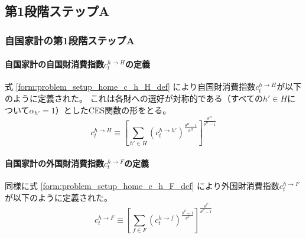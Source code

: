 
\subsection{第1段階ステップA}
\label{sec:chapter3_households_stage1a}

\subsubsection{自国家計の第1段階ステップA}
\label{sec:chapter3_households_stage1a_home}

\paragraph{自国家計の自国財消費指数\(c_t^{h\to H}\)の定義}
\label{sec:chapter3_households_stage1a_home_c_h_H_definition}
式
\eqref{form:problem_setup_home_c_h_H_def}
により自国財消費指数\(c_t^{h\to H}\)が以下のように定義された。
これは各財への選好が対称的である（すべての\(h'\in H\)について\(\alpha_{h'}=1\)）としたCES関数の形をとる。
\begin{equation}
\label{form:chapter3_households_stage1a_home_c_h_H_definition_def}
    c_t^{h\to H}\equiv\left[\sum_{h'\in H}(c_t^{h\to h'})^{\frac{\theta^H-1}{\theta^H}}\right]^{\frac{\theta^H}{\theta^H-1}}
\end{equation}

\paragraph{自国家計の外国財消費指数\(c_t^{h\to F}\)の定義}
\label{sec:chapter3_households_stage1a_home_c_h_F_definition}
同様に式
\eqref{form:problem_setup_home_c_h_F_def}
により外国財消費指数\(c_t^{h\to F}\)が以下のように定義された。
\begin{equation}
\label{form:chapter3_households_stage1a_home_c_h_F_definition_def}
    c_t^{h\to F}\equiv\left[\sum_{f\in F}(c_t^{h\to f})^{\frac{\theta^F-1}{\theta^F}}\right]^{\frac{\theta^F}{\theta^F-1}}
\end{equation}

